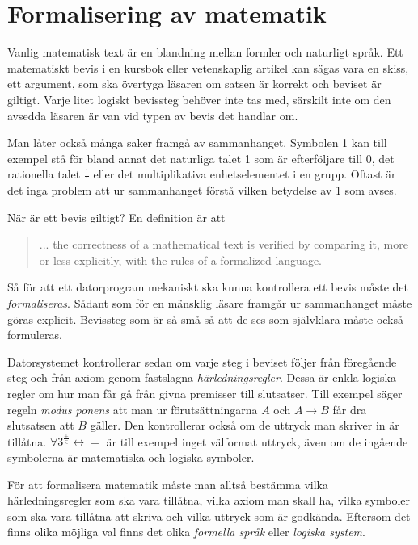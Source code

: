 \section{Formalisering av matematik}
Vanlig matematisk text är en blandning mellan formler och naturligt språk. Ett
matematiskt bevis i en kursbok eller vetenskaplig artikel kan sägas vara en
skiss, ett argument, som ska övertyga läsaren om satsen är korrekt och beviset
är giltigt. Varje litet logiskt bevissteg behöver inte tas med, särskilt inte
om den avsedda läsaren är van vid typen av bevis det handlar om.

Man låter också många saker framgå av sammanhanget. Symbolen 1 kan till exempel
stå för bland annat det naturliga talet 1 som är efterföljare till 0, det
rationella talet $\frac{1}{1}$ eller det multiplikativa enhetselementet i en
grupp. Oftast är det inga problem att ur sammanhanget förstå vilken betydelse
av 1 som avses.

När är ett bevis giltigt? En definition är att
\begin{quote}
... the correctness of a mathematical text is verified by comparing it, more or
less explicitly, with the rules of a formalized language\cite{bourbaki}.
\end{quote}

Så för att ett datorprogram mekaniskt ska kunna kontrollera ett bevis måste det
\emph{formaliseras}. Sådant som för en mänsklig läsare framgår ur sammanhanget
måste göras explicit. Bevissteg som är så små så att de ses som självklara
måste också formuleras.


Datorsystemet kontrollerar sedan om varje steg i beviset följer från föregående
steg och från axiom genom fastslagna \emph{härledningsregler}. Dessa är enkla
logiska regler om hur man får gå från givna premisser till slutsatser. Till
exempel säger regeln \emph{modus ponens} att man ur förutsättningarna $A$ och
$A \to B$ får dra slutsatsen att $B$ gäller. Den kontrollerar också om de
uttryck man skriver in är tillåtna.
$\forall 3^{\frac{+}{\in}} \leftrightarrow =$ är till exempel inget välformat
uttryck, även om de ingående symbolerna är matematiska och logiska symboler.

För att formalisera matematik måste man alltså bestämma vilka härledningsregler
som ska vara tillåtna, vilka axiom man skall ha, vilka symboler som ska vara
tillåtna att skriva och vilka uttryck som är godkända. Eftersom det finns olika
möjliga val finns det olika \emph{formella språk} eller \emph{logiska system}.

